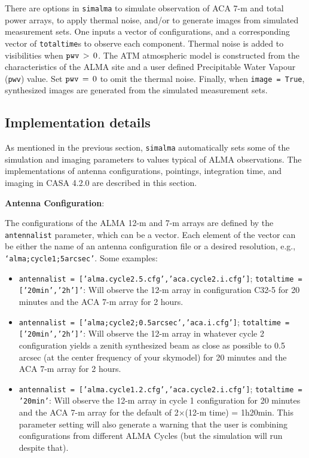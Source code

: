 There are options in {\tt simalma} to simulate
observation of ACA 7-m and total power arrays, to apply thermal noise, and/or
to generate images from simulated measurement sets.   One inputs a vector of configurations, and a corresponding vector of {\tt totaltime}s to observe each component. 
Thermal noise is added to visibilities when $ {\tt pwv} \, > \, 0 $.
The ATM atmospheric model is constructed from the characteristics of
the ALMA site and a user defined Precipitable Water Vapour ({\tt pwv})
value. 
Set $ {\tt pwv} \, = \, 0 $ to omit the thermal noise. 
Finally, when {\tt image = True}, synthesized images are generated
from the simulated measurement sets.

\subsection{Implementation details}
\label{section:sim.simalma.casa410}

As mentioned in the previous section, {\tt simalma} automatically sets
some of the simulation and imaging parameters to values typical of ALMA
observations. The implementations of antenna configurations, pointings,
integration time, and imaging in CASA 4.2.0 are described in this
section.

\smallskip
{\bf Antenna Configuration}:

The configurations of the ALMA 12-m and 7-m arrays are defined by the
{\tt antennalist} parameter, which can be a vector.  Each element of the vector can be either the name of an antenna
configuration file or a desired resolution, e.g., {\tt
  `alma;cycle1;5arcsec'}.  Some examples:
\begin{itemize}
\item {\tt antennalist = ['alma.cycle2.5.cfg','aca.cycle2.i.cfg']};  {\tt totaltime = ['20min','2h']'}: Will observe the 12-m array in configuration C32-5 for 20 minutes and the ACA 7-m array for 2 hours.
\item {\tt antennalist = ['alma;cycle2;0.5arcsec','aca.i.cfg']};  {\tt totaltime = ['20min','2h']'}: Will observe the 12-m array in whatever cycle 2 configuration yields a zenith synthesized beam as close as possible to 0.5 arcsec (at the center frequency of your skymodel) for 20 minutes and the ACA 7-m array for 2 hours.
\item {\tt antennalist = ['alma.cycle1.2.cfg','aca.cycle2.i.cfg']};  {\tt totaltime = '20min'}: Will observe the 12-m array in cycle 1 configuration for 20 minutes and the ACA 7-m array for the default of 2$\times$(12-m time) = 1h20min.  This parameter setting will also generate a warning that the user is combining configurations from different ALMA Cycles (but the simulation will run despite that).
\end{itemize}

